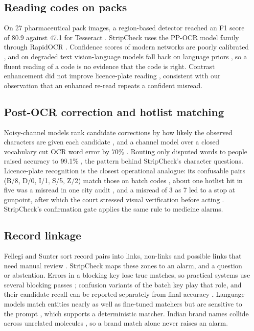 \subsection{Reading codes on packs}
On 27 pharmaceutical pack images, a region-based detector reached an F1 score of 80.9 against 47.1 for Tesseract \cite{koponen2024novel}. StripCheck uses the PP-OCR model family \cite{du2020ppocr,li2022ppocrv3} through RapidOCR \cite{rapidai2021rapidocr}. Confidence scores of modern networks are poorly calibrated \cite{guo2017calibration}, and on degraded text vision-language models fall back on language priors \cite{he2025seeing}, so a fluent reading of a code is no evidence that the code is right. Contrast enhancement did not improve licence-plate reading \cite{tavares2024comparison}, consistent with our observation that an enhanced re-read repeats a confident misread.

\subsection{Post-OCR correction and hotlist matching}
Noisy-channel models rank candidate corrections by how likely the observed characters are given each candidate \cite{kernighan1990spelling,brill2000improved}, and a channel model over a closed vocabulary cut OCR word error by 70\% \cite{kolak2002ocr}. Routing only disputed words to people raised accuracy to 99.1\% \cite{vonahn2008recaptcha}, the pattern behind StripCheck's character questions. Licence-plate recognition is the closest operational analogue: its confusable pairs (B/8, D/0, I/1, S/5, Z/2) match those on batch codes \cite{laroca2021efficient}, about one hotlist hit in five was a misread in one city audit \cite{seattleoig2023alpr}, and a misread of 3 as 7 led to a stop at gunpoint, after which the court stressed visual verification before acting \cite{green2014ninth}. StripCheck's confirmation gate applies the same rule to medicine alarms.

\subsection{Record linkage}
Fellegi and Sunter sort record pairs into links, non-links and possible links that need manual review \cite{fellegi1969theory}. StripCheck maps these zones to an alarm, \NLISTED{} and a question or abstention. Errors in a blocking key lose true matches, so practical systems use several blocking passes \cite{winkler2006overview,christen2012survey}; confusion variants of the batch key play that role, and their candidate recall can be reported separately from final accuracy \cite{papadakis2020survey}. Language models match entities nearly as well as fine-tuned matchers but are sensitive to the prompt \cite{peeters2025entity}, which supports a deterministic matcher. Indian brand names collide across unrelated molecules \cite{neelakantan2024lookalike}, so a brand match alone never raises an alarm.

